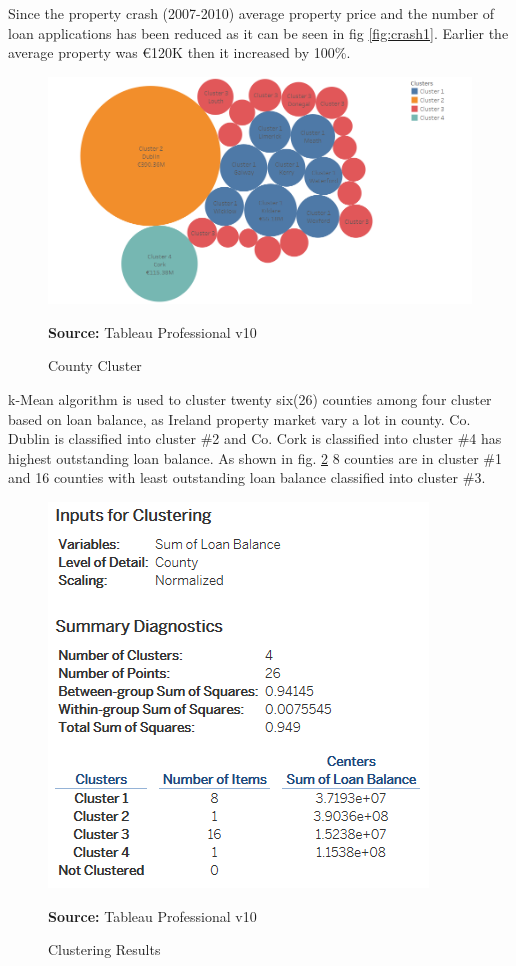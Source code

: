 Since the property crash (2007-2010) average property price and the number of loan applications has been reduced as it can be seen in fig \ref{fig:crash1}. Earlier the average property was \euro 120K then it increased by 100\%.

\begin{center}
\begin{figure}[!htb]
\includegraphics[scale=0.4]{clustero.png}
\centering
\caption{County Cluster}{\textbf{Source:} Tableau Professional v10}
\label{fig:clustero}
\end{figure}
\end{center}

k-Mean algorithm is used to cluster twenty six(26) counties among four cluster based on loan balance, as Ireland property market vary a lot in county. Co. Dublin is classified into cluster \#2 and Co. Cork is classified into cluster \#4 has highest outstanding loan balance. As shown in fig. \ref{fig:cluster} 8 counties are in cluster \#1 and 16 counties with least outstanding loan balance classified into cluster \#3.

\begin{center}
\begin{figure}[!htb]
\includegraphics[scale=0.5]{cluster.png}
\centering
\caption{Clustering Results}{\textbf{Source:} Tableau Professional v10}
\label{fig:cluster}
\end{figure}
\end{center}

